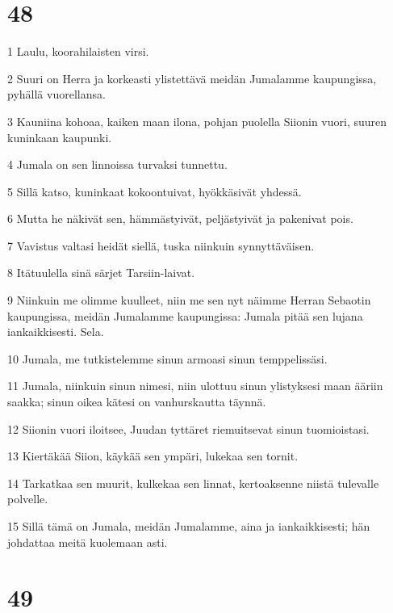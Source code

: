 \chapter{48}

\par 1 Laulu, koorahilaisten virsi.
\par 2 Suuri on Herra ja korkeasti ylistettävä meidän Jumalamme kaupungissa, pyhällä vuorellansa.
\par 3 Kauniina kohoaa, kaiken maan ilona, pohjan puolella Siionin vuori, suuren kuninkaan kaupunki.
\par 4 Jumala on sen linnoissa turvaksi tunnettu.
\par 5 Sillä katso, kuninkaat kokoontuivat, hyökkäsivät yhdessä.
\par 6 Mutta he näkivät sen, hämmästyivät, peljästyivät ja pakenivat pois.
\par 7 Vavistus valtasi heidät siellä, tuska niinkuin synnyttäväisen.
\par 8 Itätuulella sinä särjet Tarsiin-laivat.
\par 9 Niinkuin me olimme kuulleet, niin me sen nyt näimme Herran Sebaotin kaupungissa, meidän Jumalamme kaupungissa: Jumala pitää sen lujana iankaikkisesti. Sela.
\par 10 Jumala, me tutkistelemme sinun armoasi sinun temppelissäsi.
\par 11 Jumala, niinkuin sinun nimesi, niin ulottuu sinun ylistyksesi maan ääriin saakka; sinun oikea kätesi on vanhurskautta täynnä.
\par 12 Siionin vuori iloitsee, Juudan tyttäret riemuitsevat sinun tuomioistasi.
\par 13 Kiertäkää Siion, käykää sen ympäri, lukekaa sen tornit.
\par 14 Tarkatkaa sen muurit, kulkekaa sen linnat, kertoaksenne niistä tulevalle polvelle.
\par 15 Sillä tämä on Jumala, meidän Jumalamme, aina ja iankaikkisesti; hän johdattaa meitä kuolemaan asti.

\chapter{49}


